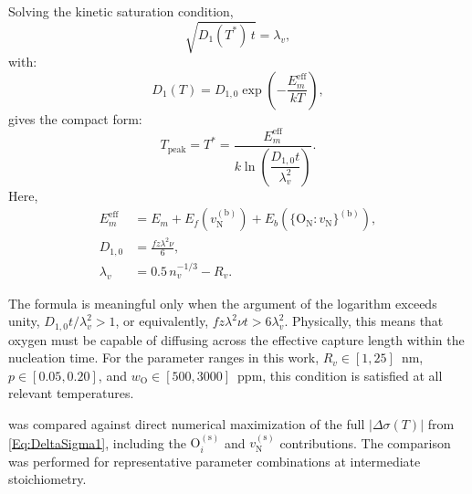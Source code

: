\documentclass[preprint,12pt,sort&compress]{elsarticle}
\newcommand{\?}{\stackrel{?}{=}}
\begin{document}
Solving the kinetic saturation condition,
\begin{equation}
\sqrt{D_1(T^*)\,t} = \lambda_v,
\end{equation}
with:
\begin{equation}
D_1(T) = D_{1,0} \exp\!\left( -\frac{E_m^\mathrm{eff}}{kT} \right),
\end{equation}
gives the compact form:
\begin{equation}
T_\text{peak} = T^* = \frac{ E_m^\mathrm{eff} }{ k\ln\!\left( \dfrac{D_{1,0}t}{\lambda_v^2} \right) }.
\label{Eq:App:TstarCompact}
\end{equation}
Here,
\begin{align}
E_m^\mathrm{eff} & = E_m + E_f(v_\text{N}^{(\text{b})}) + E_b(\{\text{O}_\text{N}:v_\text{N}\}^{(\text{b})}), \\
D_{1,0} & = \frac{f z \lambda^2 \nu}{6}, \\
\lambda_v & = 0.5\,n_v^{-1/3} - R_v.
\end{align}

The formula is meaningful only when the argument of the logarithm exceeds unity, $D_{1,0}t / \lambda_v^2 > 1$, or equivalently, $f z \lambda^2 \nu t > 6 \lambda_v^2$. Physically, this means that oxygen must be capable of diffusing across the effective capture length within the nucleation time. For the parameter ranges in this work, $R_v \in [1,25]$~nm, $p\in[0.05,0.20]$, and $w_\text{O}\in[500,3000]$~ppm, this condition is satisfied at all relevant temperatures.

 was compared against direct numerical maximization of the full $ |\Delta\sigma(T)| $ from \cref{Eq:DeltaSigma1}, including the $\text{O}_i^{(\text{s})}$ and $v_\text{N}^{(\text{s})}$ contributions. The comparison was performed for representative parameter combinations at intermediate stoichiometry.
\end{document}

